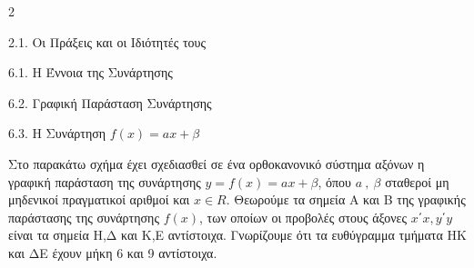 \begin{ylh}{2}
    \item 2.1. Οι Πράξεις και οι Ιδιότητές τους
    \item 6.1. Η Έννοια της Συνάρτησης
    \item 6.2. Γραφική Παράσταση Συνάρτησης
    \item 6.3. Η Συνάρτηση $f(x)=ax+\beta$
\end{ylh}
Στο παρακάτω σχήμα έχει σχεδιασθεί σε ένα ορθοκανονικό σύστημα αξόνων η γραφική παράσταση της συνάρτησης $y = f(x) = ax + \beta$, όπου $a\ ,\ \beta$ σταθεροί μη μηδενικοί πραγματικοί αριθμοί και $x \in R$. Θεωρούμε τα σημεία Α και Β της γραφικής παράστασης της συνάρτησης $f(x)$, των οποίων οι προβολές στους άξονες $x΄x, y΄y$ είναι τα σημεία Η,Δ και Κ,Ε αντίστοιχα. Γνωρίζουμε ότι τα ευθύγραμμα τμήματα ΗΚ και ΔΕ έχουν μήκη 6 και 9 αντίστοιχα.
